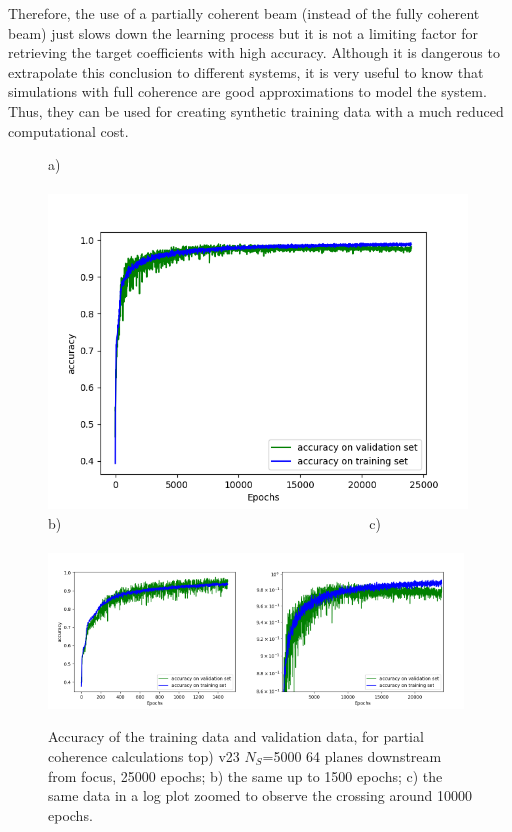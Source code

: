 \documentclass{iucr}
\begin{document}
Therefore, the use of a partially coherent beam (instead of the fully coherent beam) just slows down the learning process but it is not a limiting factor for retrieving the target coefficients with high accuracy. Although it is dangerous to extrapolate this conclusion to different systems, it is very useful to know that simulations with full coherence are good approximations to model the system. Thus, they can be used for creating synthetic training data with a much reduced computational cost. 

 
\begin{figure}\label{fig:v20}
    a)~~~~~~~~~~~~~~~~~~~~~~~~~~~~~~~~~~~~~~~~~~~~~~~~~~~~~~~~~~~~~~~~~~~~~~~~~~~~~~~\\
    \includegraphics[width=0.99\textwidth]{figures/v23.png}
    b)~~~~~~~~~~~~~~~~~~~~~~~~~~~~~~~~~~~~~~~~~~~~c)~~~~~~~~~~~~~~~~~~~~~~~~~~~~~~~~~~~~\\
    \includegraphics[width=0.49\textwidth]{figures/v20.png}\includegraphics[width=0.49\textwidth]{figures/v23z.png}
    \caption{Accuracy of the training data and validation data, for partial coherence calculations top) v23 $N_S$=5000 64 planes downstream from focus, 25000 epochs;
    b) the same up to 1500 epochs; c) the same data in a log plot zoomed to observe the crossing around 10000 epochs.
    }
\end{figure}
\end{document}

